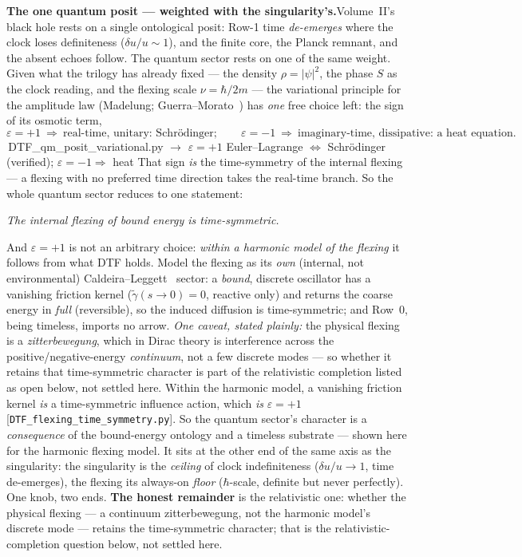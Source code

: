 \documentclass[11pt]{article}
\newcommand{\pychip}[2]{{\footnotesize\colorbox{cbPyBg}{\ttfamily\,#1\,}\,{\color{gray}$\to$ #2}}}
\begin{document}
\begin{tcolorbox}[keybox]
\textbf{The one quantum posit --- weighted with the singularity's.}\enspace Volume~II's black hole rests on
a single ontological posit: Row-1 time \emph{de-emerges} where the clock loses definiteness
($\delta u/u\sim1$), and the finite core, the Planck remnant, and the absent echoes follow. The quantum
sector rests on one of the same weight. Given what the trilogy has already fixed --- the density
$\rho=|\psi|^2$, the phase $S$ as the clock reading, and the flexing scale $\nu=\hbar/2m$ --- the
variational principle for the amplitude law (Madelung; Guerra--Morato~\cite{GuerraMorato1983}) has
\emph{one} free choice left: the sign of its osmotic term,
\[ \varepsilon=+1\ \Rightarrow\ \text{real-time, unitary: Schr\"odinger};\qquad
   \varepsilon=-1\ \Rightarrow\ \text{imaginary-time, dissipative: a heat equation}. \]
\pychip{DTF\_qm\_posit\_variational.py}{$\varepsilon{=}{+}1$ Euler--Lagrange $\Leftrightarrow$ Schr\"odinger (verified); $\varepsilon{=}{-}1\Rightarrow$ heat}
That sign \emph{is} the time-symmetry of the internal flexing --- a flexing with no preferred time
direction takes the real-time branch. So the whole quantum sector reduces to one statement:
\begin{center}\itshape The internal flexing of bound energy is time-symmetric.\end{center}
\noindent And $\varepsilon=+1$ is not an arbitrary choice: \emph{within a harmonic model of the flexing} it
follows from what DTF holds. Model the flexing as its \emph{own} (internal, not environmental)
Caldeira--Leggett~\cite{CaldeiraLeggett1983} sector: a \emph{bound}, discrete oscillator has a vanishing
friction kernel ($\tilde\gamma(s\!\to\!0)=0$, reactive only) and returns the coarse energy in \emph{full}
(reversible), so the induced diffusion is time-symmetric; and Row~0, being timeless, imports no arrow.
\emph{One caveat, stated plainly:} the physical flexing is a \emph{zitterbewegung}, which in Dirac theory
is interference across the positive/negative-energy \emph{continuum}, not a few discrete modes --- so
whether it retains that time-symmetric character is part of the relativistic completion listed as open
below, not settled here. Within the harmonic model, a vanishing friction kernel \emph{is} a
time-symmetric influence action, which \emph{is} $\varepsilon=+1$
[\texttt{DTF\_flexing\_time\_symmetry.py}]. So the quantum sector's character is a \emph{consequence} of the
bound-energy ontology and a timeless substrate --- shown here for the harmonic flexing model. It sits at the
other end of the same axis as the singularity: the singularity is the \emph{ceiling} of clock indefiniteness
($\delta u/u\to1$, time de-emerges), the flexing its always-on \emph{floor} ($\hbar$-scale, definite but
never perfectly). One knob, two ends. \textbf{The honest remainder} is the relativistic one: whether the
physical flexing --- a continuum zitterbewegung, not the harmonic model's discrete mode --- retains the
time-symmetric character; that is the relativistic-completion question below, not settled here.
\end{tcolorbox}
\end{document}
